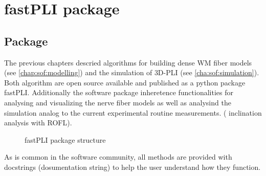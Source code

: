 \setcounter{chapter}{5}
\chapter{\acs{fastPLI} package}
\label{chap:Software}
% 
% 
% 
%  
\section{Package}
% 
The previous chapters descried algorithms for building dense \ac{WM} fiber models (see \cref{chap:sof:modelling}) and the simulation of \ac{3D-PLI} (see \cref{cha:sof:simulation}).
Both algorithm are open source available and published \cite{fastpli,Matuschke2021} as a python package \ac{fastPLI}.
% 
Additionally the software package inheretence functionalities for analysing and visualizing the nerve fiber models as well as analysind the simulation analog to the current experimental routine measurements. (\eg{} inclination analysis with \ac{ROFL}).
% 
\begin{figure}[!ht]
\centering
{}
\caption[\acs{fastPLI}]{\ac{fastPLI} package structure}
\label{fig:fastpli}
\end{figure}
% 
As is common in the software community, all methods are provided with docstrings (dosumentation string) to help the user understand how they function.
% 
